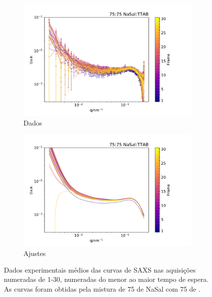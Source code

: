 	\begin{figure}[h]
		\begin{subfigure}[t]{0.5\textwidth}
			\centering
			\includegraphics[width=\textwidth]{imagens/saxs/TR_saxs_75_75_dados.pdf}
			\caption{Dados}
			\label{fig:saxs_tr_75_d}
		\end{subfigure}%
		\begin{subfigure}[t]{0.5\textwidth}
			\centering
			\includegraphics[width=\textwidth]{imagens/saxs/TR_saxs_75_75_ajuste.pdf}
			\caption{Ajustes}
			\label{fig:saxs_tr_a}
		\end{subfigure}
		\caption{Dados experimentais médios das curvas de SAXS nas aquisições numeradas de 1-30, numeradas do menor ao maior tempo de espera. As curvas foram obtidas pela mistura de 75 \mM{} de NaSal com 75 \mM{} de \TTAB.}
		\label{fig:saxs_tr_75}
	\end{figure} 
	
